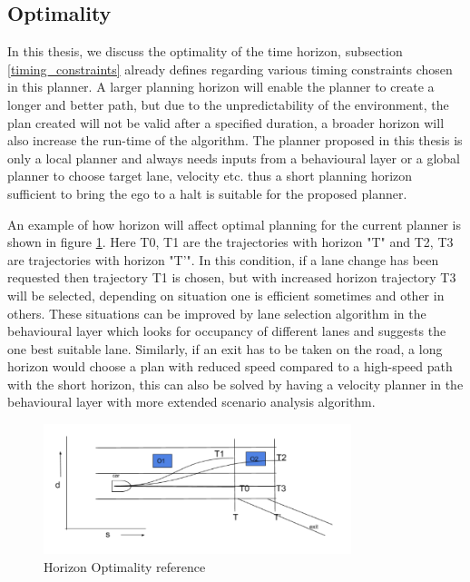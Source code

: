 \subsection{Optimality}
 In this thesis, we discuss the optimality of the time horizon, subsection \ref{timing_constraints} already defines regarding various timing constraints chosen in this planner. A larger planning horizon will enable the planner to create a longer and better path, but due to the unpredictability of the environment, the plan created will not be valid after a specified duration, a broader horizon will also increase the run-time of the algorithm. The planner proposed in this thesis is only a local planner and always needs inputs from a behavioural layer or a global planner to choose target lane, velocity etc. thus a short planning horizon sufficient to bring the ego to a halt is suitable for the proposed planner. 

An example of how horizon will affect optimal planning for the current planner is shown in figure \ref{horizon_optimality}. Here T0, T1 are the trajectories with horizon "T" and T2, T3 are trajectories with horizon "T'". In this condition, if a lane change has been requested then trajectory T1 is chosen, but with increased horizon trajectory T3 will be selected, depending on situation one is efficient sometimes and other in others. These situations can be improved by lane selection algorithm in the behavioural layer which looks for occupancy of different lanes and suggests the one best suitable lane. Similarly, if an exit has to be taken on the road, a long horizon would choose a plan with reduced speed compared to a high-speed path with the short horizon, this can also be solved by having a velocity planner in the behavioural layer with more extended scenario analysis algorithm.  

\begin{figure}[h]
    \centering
    \includegraphics[width=0.8\textwidth]{Images/horizaon_optimality_2.png}
    \caption{Horizon Optimality reference}
    \label{horizon_optimality}
\end{figure}
 
